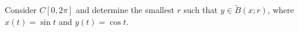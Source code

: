 Consider $C[0,2\pi]$ and determine the smallest $r$ such that $y\in \tilde{B}(x;r)$, where $x(t)=\sin t$
and $y(t)=\cos t$.\\